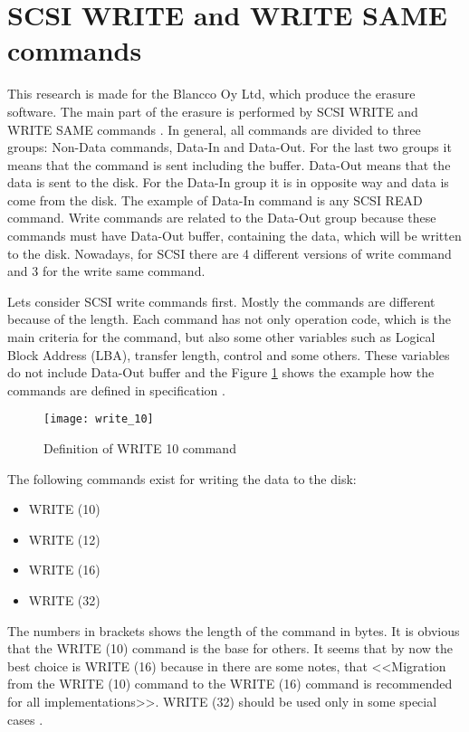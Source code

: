 \section{SCSI WRITE and WRITE SAME commands}
\label{subsec:write_comm}
This research is made for the Blancco Oy Ltd, which produce the erasure software. The main part of the erasure is performed by SCSI WRITE and WRITE SAME commands \cite{scsi3_bc}. In general, all commands are divided to three groups: Non-Data commands, Data-In and Data-Out. For the last two groups it means that the command is sent including the buffer. Data-Out means that the data is sent to the disk. For the Data-In group it is in opposite way and data is come from the disk. The example of Data-In command is any SCSI READ command. Write commands are related to the Data-Out group because these commands must have Data-Out buffer, containing the data, which will be written to the disk. Nowadays, for SCSI there are 4 different versions of write command and 3 for the write same command.  

Lets consider SCSI write commands first. Mostly the commands are different because of the length. Each command has not only operation code, which is the main criteria for the command, but also some other variables such as Logical Block Address (LBA), transfer length, control and some others. These variables do not include Data-Out buffer and the Figure \ref{fig:write_10} shows the example how the commands are defined in specification \cite{scsi3_bc}.
\begin{figure}[h]
\begin{center}
  \texttt{[image: write\_10]}
\end{center}
  \caption{Definition of WRITE 10 command}
  \label{fig:write_10}
\end{figure}


The following commands exist for writing the data to the disk:
\begin{itemize}%
	\setlength{\itemsep}{-2mm}
	\item WRITE (10)
	\item WRITE (12)
	\item WRITE (16)
	\item WRITE (32)
\end{itemize}
The numbers in brackets shows the length of the command in bytes. It is obvious that the WRITE (10) command is the base for others. It seems that by now the best choice is WRITE (16) because in \cite{scsi3_bc} there are some notes, that <<Migration from the WRITE (10) command to the WRITE (16) command is recommended for all implementations>>. WRITE (32) should be used only in some special cases \cite{scsi3_bc}.

